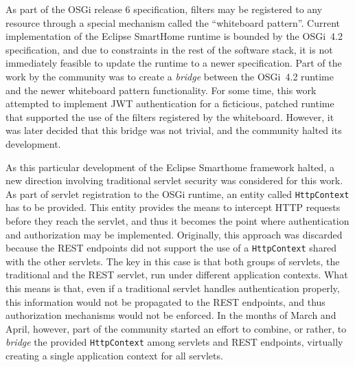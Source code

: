 \documentclass[12pt]{article}
\begin{document}
As part of the OSGi release 6 specification, filters may be registered to any resource through a special mechanism called the ``whiteboard pattern''. Current implementation of the Eclipse SmartHome runtime is bounded by the OSGi~4.2 specification, and due to constraints in the rest of the software stack, it is not immediately feasible to update the runtime to a newer specification. Part of the work by the community was to create a \emph{bridge} between the OSGi~4.2 runtime and the newer whiteboard pattern functionality. For some time, this work attempted to implement JWT authentication for a ficticious, patched runtime that supported the use of the filters registered by the whiteboard. However, it was later decided that this bridge was not trivial, and the community halted its development.

As this particular development of the Eclipse Smarthome framework halted, a new direction involving traditional servlet security was considered for this work. As part of servlet registration to the OSGi runtime, an entity called \texttt{HttpContext} has to be provided. This entity provides the means to intercept HTTP requests before they reach the servlet, and thus it becomes the point where authentication and authorization may be implemented. Originally, this approach was discarded because the REST endpoints did not support the use of a \texttt{HttpContext} shared with the other servlets. The key in this case is that both groups of servlets, the traditional and the REST servlet, run under different application contexts. What this means is that, even if a traditional servlet handles authentication properly, this information would not be propagated to the REST endpoints, and thus authorization mechanisms would not be enforced. In the months of March and April, however, part of the community started an effort to combine, or rather, to \emph{bridge} the provided \texttt{HttpContext} among servlets and REST endpoints, virtually creating a single application context for all servlets.
\end{document}
